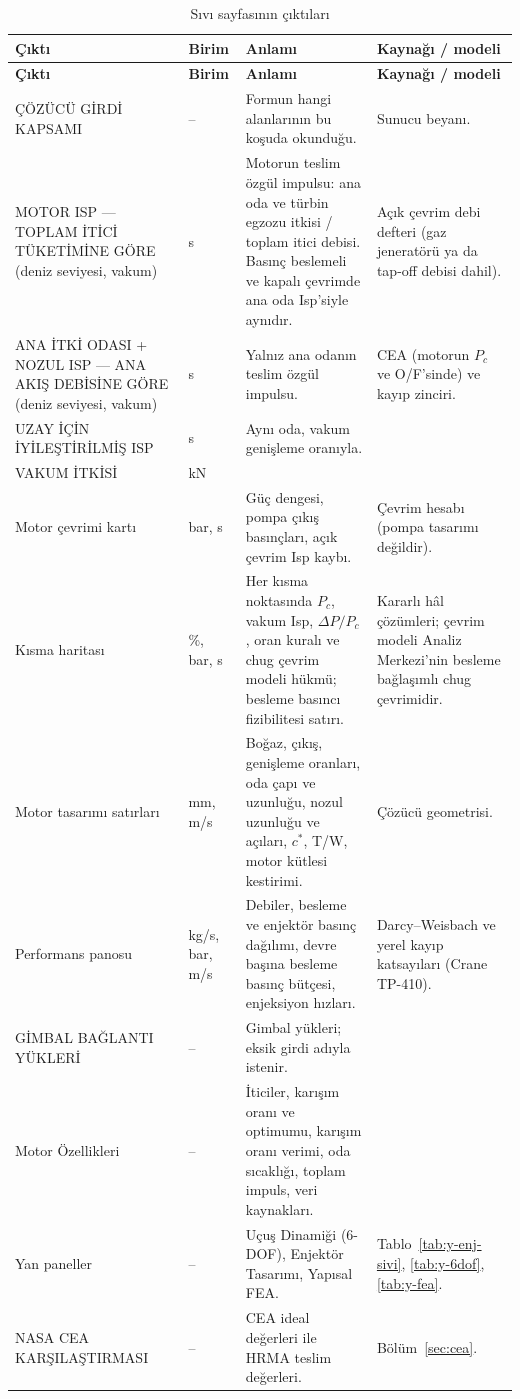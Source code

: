 \documentclass[11pt,a4paper]{article}
\newcommand{\ui}[1]{\textsf{#1}}
\begin{document}
\begin{longtable}{@{}>{\raggedright\arraybackslash}p{4.4cm}>{\raggedright\arraybackslash}p{1.3cm}>{\raggedright\arraybackslash}p{5.0cm}>{\raggedright\arraybackslash}p{4.9cm}@{}}
\caption{Sıvı sayfasının çıktıları}\label{tab:sivi-cikti}\\
\toprule
\textbf{Çıktı} & \textbf{Birim} & \textbf{Anlamı} & \textbf{Kaynağı / modeli} \\
\midrule\endfirsthead
\toprule
\textbf{Çıktı} & \textbf{Birim} & \textbf{Anlamı} & \textbf{Kaynağı / modeli} \\
\midrule\endhead
\bottomrule\endlastfoot
\ui{ÇÖZÜCÜ GİRDİ KAPSAMI} & -- & Formun hangi alanlarının bu koşuda okunduğu. & Sunucu beyanı. \\
\ui{MOTOR ISP — TOPLAM İTİCİ TÜKETİMİNE GÖRE} (deniz seviyesi, vakum) & s & Motorun teslim özgül impulsu: ana oda ve türbin egzozu itkisi / toplam itici debisi. Basınç beslemeli ve kapalı çevrimde ana oda Isp'siyle aynıdır. & Açık çevrim debi defteri (gaz jeneratörü ya da tap-off debisi dahil). \\
\ui{ANA İTKİ ODASI + NOZUL ISP — ANA AKIŞ DEBİSİNE GÖRE} (deniz seviyesi, vakum) & s & Yalnız ana odanın teslim özgül impulsu. & CEA (motorun $P_c$ ve O/F'sinde) ve kayıp zinciri. \\
\ui{UZAY İÇİN İYİLEŞTİRİLMİŞ ISP} & s & Aynı oda, vakum genişleme oranıyla. & \\
\ui{VAKUM İTKİSİ} & kN & & \\
Motor çevrimi kartı & bar, s & Güç dengesi, pompa çıkış basınçları, açık çevrim Isp kaybı. & Çevrim hesabı (pompa tasarımı değildir). \\
Kısma haritası & \%, bar, s & Her kısma noktasında $P_c$, vakum Isp, $\Delta P/P_c$, oran kuralı ve chug çevrim modeli hükmü; besleme basıncı fizibilitesi satırı. & Kararlı hâl çözümleri; çevrim modeli Analiz Merkezi'nin besleme bağlaşımlı chug çevrimidir. \\
Motor tasarımı satırları & mm, m/s & Boğaz, çıkış, genişleme oranları, oda çapı ve uzunluğu, nozul uzunluğu ve açıları, $c^*$, T/W, motor kütlesi kestirimi. & Çözücü geometrisi. \\
Performans panosu & kg/s, bar, m/s & Debiler, besleme ve enjektör basınç dağılımı, devre başına besleme basınç bütçesi, enjeksiyon hızları. & Darcy--Weisbach ve yerel kayıp katsayıları (Crane TP-410). \\
\ui{GİMBAL BAĞLANTI YÜKLERİ} & -- & Gimbal yükleri; eksik girdi adıyla istenir. & \\
\ui{Motor Özellikleri} & -- & İticiler, karışım oranı ve optimumu, karışım oranı verimi, oda sıcaklığı, toplam impuls, veri kaynakları. & \\
Yan paneller & -- & Uçuş Dinamiği (6-DOF), Enjektör Tasarımı, Yapısal FEA. & Tablo~\ref{tab:y-enj-sivi}, \ref{tab:y-6dof}, \ref{tab:y-fea}. \\
\ui{NASA CEA KARŞILAŞTIRMASI} & -- & CEA ideal değerleri ile HRMA teslim değerleri. & Bölüm~\ref{sec:cea}. \\
\end{longtable}
\end{document}
